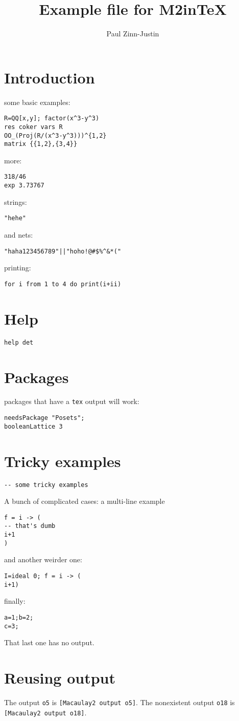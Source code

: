 \documentclass[12pt,a4paper]{amsart}
\title{Example file for M2inTeX}
\author{Paul Zinn-Justin}
\begin{document}
\maketitle

\section{Introduction}
some basic examples:
\begin{lstlisting}[language=Macaulay2]
R=QQ[x,y]; factor(x^3-y^3)
res coker vars R
OO_(Proj(R/(x^3-y^3)))^{1,2}
matrix {{1,2},{3,4}}
\end{lstlisting}
more:
\begin{lstlisting}[language=Macaulay2]
318/46
exp 3.73767
\end{lstlisting}
strings:
\begin{lstlisting}[language=Macaulay2]
"hehe"
\end{lstlisting}
and nets:
\begin{lstlisting}[language=Macaulay2]
"haha123456789"||"hoho!@#$%^&*("
\end{lstlisting}
printing:
\begin{lstlisting}[language=Macaulay2]
for i from 1 to 4 do print(i+ii)
\end{lstlisting}

\section{Help}
\begin{lstlisting}[language=Macaulay2]
help det
\end{lstlisting}

\section{Packages}
packages that have a {\tt tex} output will work:
\begin{lstlisting}[language=Macaulay2]
needsPackage "Posets";
booleanLattice 3
\end{lstlisting}

\section{Tricky examples}
\begin{lstlisting}[language=Macaulay2]
-- some tricky examples
\end{lstlisting}
A bunch of complicated cases: a multi-line example
\begin{lstlisting}[language=Macaulay2]
f = i -> (
-- that's dumb
i+1
)
\end{lstlisting}
and another weirder one:
\begin{lstlisting}[language=Macaulay2]
I=ideal 0; f = i -> (
i+1)
\end{lstlisting}
finally:
\begin{lstlisting}[language=Macaulay2]
a=1;b=2;
c=3;
\end{lstlisting}
That last one has no output.

\section{Reusing output}
\newcommand\macoutput[1]{{\tt [Macaulay2 output o#1]}}%
The output {\tt o5} is \macoutput{5}.
The nonexistent output {\tt o18} is \macoutput{18}.
\end{document}
